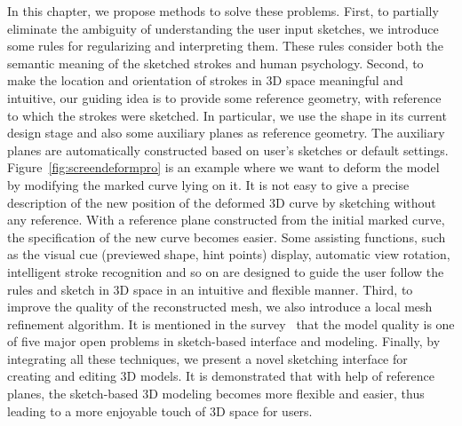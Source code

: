 In this chapter, we propose methods to solve these problems. First, to partially eliminate the ambiguity of understanding the user input sketches, we introduce some rules for regularizing and interpreting them. These rules consider both the semantic meaning of the sketched strokes and human psychology. Second, to make the location and orientation of strokes in 3D space meaningful and intuitive, our guiding idea is to provide some reference geometry, with reference to which the strokes were sketched. In particular, we use the shape in its current design stage and also some auxiliary planes as reference geometry. The auxiliary planes are automatically constructed based on user's sketches or default settings. Figure~\ref{fig:screendeformpro} is an example where we want to deform the model by modifying the marked curve lying on it. It is not easy to give a precise description of the new position of the deformed 3D curve by sketching without any reference. With a reference plane constructed from the initial marked curve, the specification of the new curve becomes easier. Some assisting functions, such as the visual cue (previewed shape, hint points) display, automatic view rotation, intelligent stroke recognition and so on are designed to guide the user follow the rules and sketch in 3D space in an intuitive and flexible manner. Third, to improve the quality of the reconstructed mesh, we also introduce a local mesh refinement algorithm. It is mentioned in the survey~\cite{OSSJ09} that the model quality is one of five major open problems in sketch-based interface and modeling. Finally, by integrating all these techniques, we present a novel sketching interface for creating and editing 3D models. It is demonstrated that with help of reference planes, the sketch-based 3D modeling becomes more flexible and easier, thus leading to a more enjoyable touch of 3D space for users.

